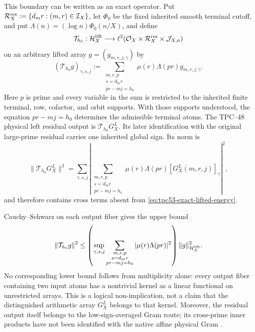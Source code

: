 This boundary can be written as an exact operator.  Put
\(\mathcal R_X^{\rm res}:=\{d_mr:(m,r)\in\mathcal I_X\}\), let
\(\Phi_0\) be the fixed inherited smooth terminal cutoff, and put
\(\Lambda(n)=(\log n)\Phi_0(n/X)\),
and define
\[
 \mathcal T_{h_0}:\mathcal H_X^{\rm lift}\longrightarrow
 \ell^2(\mathcal O_X\times\mathcal R_X^{\rm res}\times\mathcal J_{X,a})
\]
on an arbitrary lifted array \(g=(g_{m,r,j,\gamma})\) by
\begin{equation}
 (\mathcal T_{h_0}g)_{\gamma,s,j}
 :=
 \sum_{\substack{m,r,p\\s=d_mr\\pr-mj=h_0}}
 \mu(r)\Lambda(pr)g_{m,r,j,\gamma}.
 \label{eq:tpc53-terminal-grouping-map}
\end{equation}
Here \(p\) is prime and every variable in the sum is restricted to the
inherited finite terminal, row, cofactor, and orbit supports.  With
those supports understood, the equation \(pr-mj=h_0\) determines the
admissible terminal atoms.
The TPC--48 physical left residual output is
\(\mathcal T_{h_0}G_X^L\).  Its later identification with the original
large-prime residual carries one inherited global sign.  Its norm is
\begin{equation}
 \|\mathcal T_{h_0}G_X^L\|^2
 =
 \sum_{\gamma,s,j}
 \left|
 \sum_{\substack{m,r,p\\s=d_mr\\pr-mj=h_0}}
 \mu(r)\Lambda(pr)[G_X^L(m,r,j)]_\gamma
 \right|^2,
 \label{eq:tpc53-terminal-cross-term-norm}
\end{equation}
and therefore contains cross terms absent from
\eqref{eq:tpc53-exact-lifted-energy}.

Cauchy--Schwarz on each output fiber gives the upper bound
\begin{equation}
 \|\mathcal T_{h_0}g\|^2
 \le
 \left(
  \sup_{\gamma,s,j}
  \sum_{\substack{m,r,p\\s=d_mr\\pr-mj=h_0}}
  |\mu(r)\Lambda(pr)|^2
 \right)
 \|g\|_{\mathcal H_X^{\rm lift}}^2.
 \label{eq:tpc53-terminal-upper-bound}
\end{equation}
No corresponding lower bound follows from multiplicity alone: every
output fiber containing two input atoms has a nontrivial kernel as a
linear functional on unrestricted arrays.  This is a logical
non-implication, not a claim that the distinguished arithmetic array
\(G_X^L\) belongs to that kernel.  Moreover, the residual output itself
belongs to the low-sign-averaged Gram route; its cross-prime inner
products have not been identified with the native affine physical Gram
\citep{WangTPC48}.
